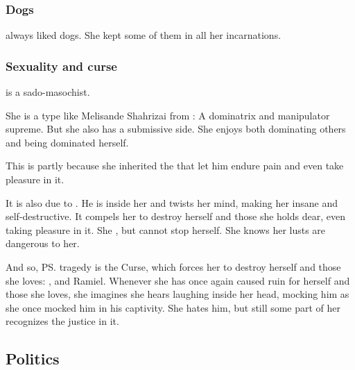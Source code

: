 \subsubsection{Dogs}
\Shiaraid{} always liked dogs. 
She kept some of them in all her incarnations. 





\subsubsection{Sexuality and curse}
\Shiaraid{} is a sado-masochist. 

She is a type like Melisande Shahrizai from : 
A dominatrix and manipulator supreme. 
But she also has a submissive side. 
She enjoys both dominating others and being dominated herself. 

This is partly because she inherited the  that let him endure pain and even take pleasure in it. 

It is also due to . 
He is inside her and twists her mind, making her insane and self-destructive. 
It compels her to destroy herself and those she holds dear, even taking pleasure in it. 
She , but cannot stop herself. 
She knows her lusts are dangerous to her. 

\begin{prose}
\end{prose}

And so, \ps{\Shiaraid} tragedy is the Curse, which forces her to destroy herself and those she loves: 
\Aryal, \Zachirah{} and Ramiel. 
Whenever she has once again caused ruin for herself and those she loves, she imagines she hears \Nexagglachel{} laughing inside her head, mocking him as she once mocked him in his captivity. 
She hates him, but still some part of her recognizes the justice in it. 










\subsection{Politics}





